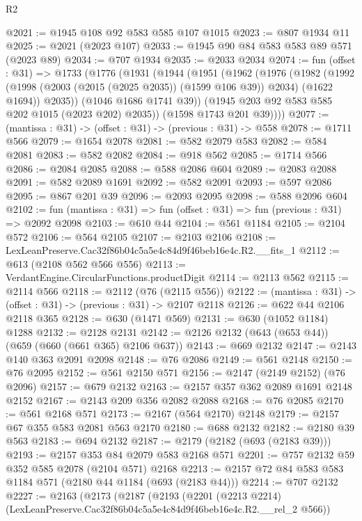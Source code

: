 \begin{lexlean}{R2}
\begin{coremodule}
@2021 := @1945 @108 @92 @583 @585 @107 @1015
@2023 := @807 @1934 @11
@2025 := @2021 (@2023 @107)
@2033 := @1945 @90 @84 @583 @583 @89 @571 (@2023 @89)
@2034 := @707 @1934
@2035 := @2033 @2034
@2074 := fun (offset : @31) =>
  @1733
    (@1776
      (@1931
        (@1944
          (@1951
            (@1962
              (@1976
                (@1982
                  (@1992 (@1998 (@2003 (@2015 (@2025 @2035)) (@1599 @106 @39)) @2034) (@1622 @1694))
                  @2035))
              (@1046 @1686 @1741 @39))
            (@1945 @203 @92 @583 @585 @202 @1015 (@2023 @202) @2035))
          (@1598 @1743 @201 @39))))
@2077 := (mantissa : @31) -> (offset : @31) -> (previous : @31) -> @558
@2078 := @1711 @566
@2079 := @1654 @2078
@2081 := @582 @2079 @583
@2082 := @584 @2081
@2083 := @582 @2082
@2084 := @918 @562
@2085 := @1714 @566
@2086 := @2084 @2085
@2088 := @588 @2086 @604
@2089 := @2083 @2088
@2091 := @582 @2089 @1691
@2092 := @582 @2091
@2093 := @597 @2086
@2095 := @867 @201 @39
@2096 := @2093 @2095
@2098 := @588 @2096 @604
@2102 := fun (mantissa : @31) => fun (offset : @31) => fun (previous : @31) => @2092 @2098
@2103 := @610 @44
@2104 := @561 @1184
@2105 := @2104 @572
@2106 := @564 @2105
@2107 := @2103 @2106
@2108 := LexLeanPreserve.Cac32f86b04c5a5e4c84d9f46beb16e4c.R2.__fits_1
@2112 := @613 (@2108 @562 @566 @556)
@2113 := VerdantEngine.CircularFunctions.productDigit
@2114 := @2113 @562
@2115 := @2114 @566
@2118 := @2112 (@76 (@2115 @556))
@2122 := (mantissa : @31) -> (offset : @31) -> (previous : @31) -> @2107 @2118
@2126 := @622 @44 @2106 @2118 @365
@2128 := @630 (@1471 @569)
@2131 := @630 (@1052 @1184) @1288
@2132 := @2128 @2131
@2142 := @2126 @2132 (@643 (@653 @44)) (@659 (@660 (@661 @365) @2106 @637))
@2143 := @669 @2132
@2147 := @2143 @140 @363 @2091 @2098
@2148 := @76 @2086
@2149 := @561 @2148
@2150 := @76 @2095
@2152 := @561 @2150 @571
@2156 := @2147 (@2149 @2152) (@76 @2096)
@2157 := @679 @2132
@2163 := @2157 @357 @362 @2089 @1691 @2148 @2152
@2167 := @2143 @209 @356 @2082 @2088
@2168 := @76 @2085
@2170 := @561 @2168 @571
@2173 := @2167 (@564 @2170) @2148
@2179 := @2157 @67 @355 @583 @2081 @563 @2170
@2180 := @688 @2132
@2182 := @2180 @39 @563
@2183 := @694 @2132
@2187 := @2179 (@2182 (@693 (@2183 @39)))
@2193 := @2157 @353 @84 @2079 @583 @2168 @571
@2201 := @757 @2132 @59 @352 @585 @2078 (@2104 @571) @2168
@2213 := @2157 @72 @84 @583 @583 @1184 @571 (@2180 @44 @1184 (@693 (@2183 @44)))
@2214 := @707 @2132
@2227 := @2163
    (@2173
      (@2187
        (@2193
          (@2201 (@2213 @2214) (LexLeanPreserve.Cac32f86b04c5a5e4c84d9f46beb16e4c.R2.__rel_2 @566))

\end{coremodule}
\end{lexlean}
